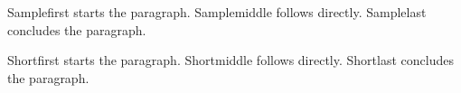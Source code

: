 \documentclass{article}
\begin{document}
\ttfamily
\setlength{\parindent}{1.27cm}
Samplefirst starts the paragraph.\newline
Samplemiddle follows directly.\newline
Samplelast concludes the paragraph.\par
\setlength{\parindent}{6mm}
Shortfirst starts the paragraph.\newline
Shortmiddle follows directly.\newline
Shortlast concludes the paragraph.\par
\end{document}
